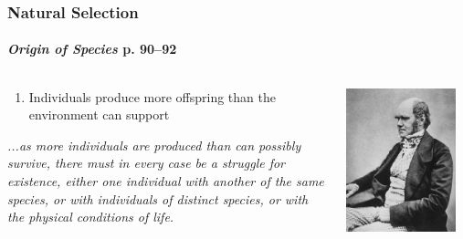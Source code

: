\documentclass[10pt]{beamer}
\begin{document}
\begin{frame}[t]
\frametitle{Natural Selection}
\framesubtitle{\emph{Origin of Species} p. 90--92}
\vspace{0.5cm}

	\begin{columns}
		\begin{column}{0.7\textwidth}
			\begin{enumerate}
				\item Individuals produce more offspring than the environment can support\\
			\end{enumerate}
			
			\vspace{0.5cm}
			
			\emph{\footnotesize{...as more individuals are produced than can possibly survive, there must in every case be a struggle for existence, either one individual with another of the same species, or with individuals of distinct species, or with the physical conditions of life.}}
		\end{column}
		
		\begin{column}{0.3\textwidth}
			\begin{center}
				\includegraphics[width=0.9\textwidth]{figures/Darwin.jpg}
			\end{center}
		\end{column}
	\end{columns}
\end{frame}
\end{document}
